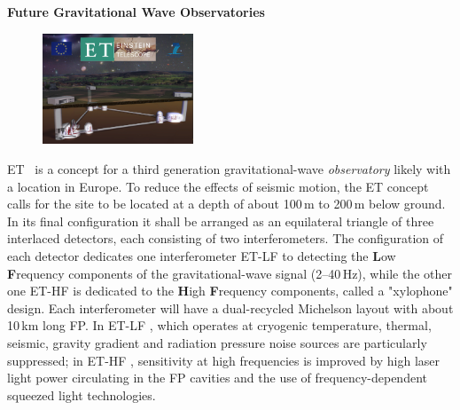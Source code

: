 \begin{DetBox}{\bf Future Gravitational Wave Observatories}
\label{Box:GWOs}
\begin{tcolorbox}[standard jigsaw,colback=amber!10!white,colframe=red!70!black,coltext=black,size=small,  title=The Einstein gravitational--wave Telescope (ET)] 
\begin{figure}
\vspace{-10pt}
\includegraphics*[width=0.4\textwidth]{Figures/ET_Thumb.png}
\label{fig:ET_Thumb}
\vspace{-25pt}
\end{figure}
ET~\cite{ET2011} is 
 a concept for a third generation gravitational-wave \emph{observatory}
 likely with a location in Europe. 
 To reduce the effects of seismic motion, the \ac{ET} concept calls for the site to be located at a depth of about 100\,m to 200\,m below ground. In its final configuration it shall be arranged as an equilateral triangle of three interlaced detectors, each consisting of two interferometers. The configuration of each detector dedicates one interferometer \ac{ET-LF}  to detecting the \textbf{L}ow \textbf{F}requency components of the gravitational-wave signal (2--40\,Hz), while the other one \ac{ET-HF}   is dedicated to the \textbf{H}igh \textbf{F}requency components, called a "xylophone" design. Each interferometer will have a dual-recycled Michelson layout with about 10\,km long \ac{FP}. In \ac{ET-LF} , which operates at cryogenic temperature, thermal, seismic, gravity gradient and radiation pressure noise sources are particularly suppressed; in \ac{ET-HF} , sensitivity at high frequencies is improved by high laser light power circulating in the \ac{FP}  cavities and the use of frequency-dependent squeezed light technologies.
\end{tcolorbox}



\end{DetBox}
